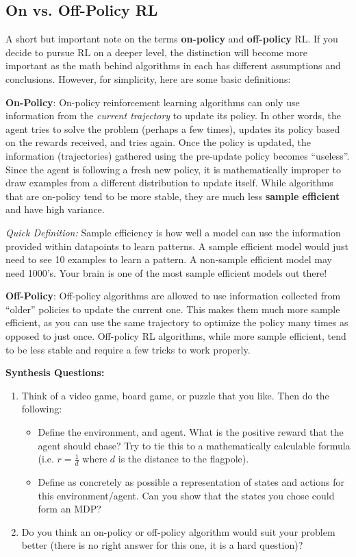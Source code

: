 \subsection{On vs. Off-Policy RL}
    \large A short but important note on the terms \textbf{on-policy} and \textbf{off-policy} RL. If you decide to pursue RL on a deeper level, the distinction will become more important as the math behind algorithms in each has different assumptions and conclusions. However, for simplicity, here are some basic definitions: 

    \textbf{On-Policy}: On-policy reinforcement learning algorithms can only use information from the \textit{current trajectory} to update its policy. In other words, the agent tries to solve the problem (perhaps a few times), updates its policy based on the rewards received, and tries again. Once the policy is updated, the information (trajectories) gathered using the pre-update policy becomes ``useless''. Since the agent is following a fresh new policy, it is mathematically improper to draw examples from a different distribution to update itself. While algorithms that are on-policy tend to be more stable, they are much less \textbf{sample efficient} and have high variance. 
    
    \textit{Quick Definition:} Sample efficiency is how well a model can use the information provided within datapoints to learn patterns. A sample efficient model would just need to see 10 examples to learn a pattern. A non-sample efficient model may need 1000's. Your brain is one of the most sample efficient models out there! 

    \textbf{Off-Policy}: Off-policy algorithms are allowed to use information collected from ``older'' policies to update the current one. This makes them much more sample efficient, as you can use the same trajectory to optimize the policy many times as opposed to just once. Off-policy RL algorithms, while more sample efficient, tend to be less stable and require a few tricks to work properly.

\begin{questionbox}
\textbf{Synthesis Questions:}
\begin{enumerate}
    \item Think of a video game, board game, or puzzle that you like. Then do the following:
    \begin{itemize}
        \item Define the environment, and agent. What is the positive reward that the agent should chase? Try to tie this to a mathematically calculable formula (i.e. $r = \frac{1}{d}$ where $d$ is the distance to the flagpole).
        \item Define as concretely as possible a representation of states and actions for this environment/agent. Can you show that the states you chose could form an MDP?
    \end{itemize}
    \item Do you think an on-policy or off-policy algorithm would suit your problem better (there is no right answer for this one, it is a hard question)?
\end{enumerate}
\end{questionbox}


